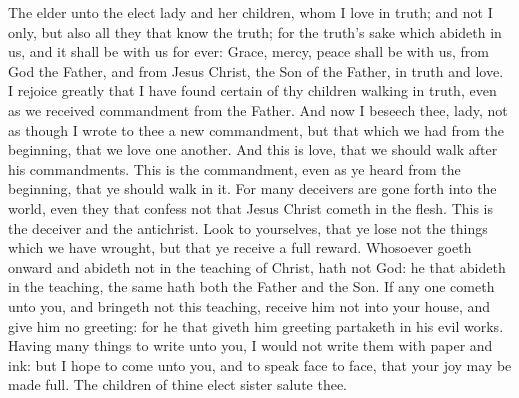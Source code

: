 


The elder unto the elect lady and her children, whom I love in truth; and not I only, but also all they that know the truth; for the truth’s sake which abideth in us, and it shall be with us for ever: Grace, mercy, peace shall be with us, from God the Father, and from Jesus Christ, the Son of the Father, in truth and love.  I rejoice greatly that I have found certain of thy children walking in truth, even as we received commandment from the Father. And now I beseech thee, lady, not as though I wrote to thee a new commandment, but that which we had from the beginning, that we love one another. And this is love, that we should walk after his commandments. This is the commandment, even as ye heard from the beginning, that ye should walk in it. For many deceivers are gone forth into the world, even they that confess not that Jesus Christ cometh in the flesh. This is the deceiver and the antichrist. Look to yourselves, that ye lose not the things which we have wrought, but that ye receive a full reward. Whosoever goeth onward and abideth not in the teaching of Christ, hath not God: he that abideth in the teaching, the same hath both the Father and the Son. If any one cometh unto you, and bringeth not this teaching, receive him not into your house, and give him no greeting: for he that giveth him greeting partaketh in his evil works.  Having many things to write unto you, I would not write them with paper and ink: but I hope to come unto you, and to speak face to face, that your joy may be made full. The children of thine elect sister salute thee. 
